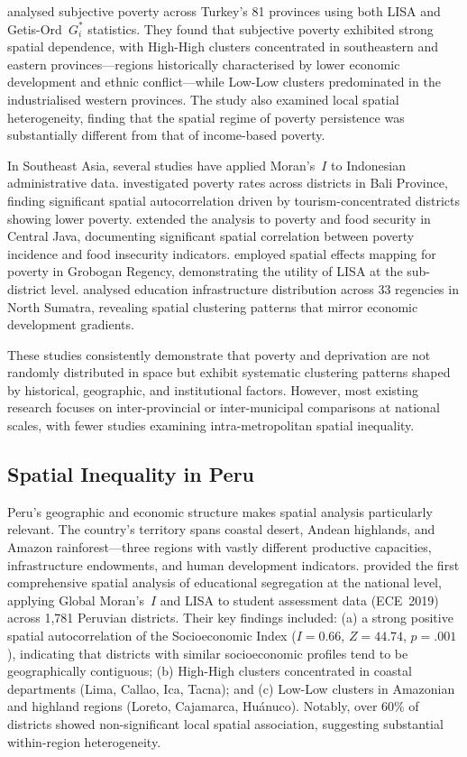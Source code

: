 \documentclass[12pt,a4paper,twoside]{article}
\begin{document}
\citet{tatli2025subjective} analysed subjective poverty across Turkey's 81 provinces
using both LISA and Getis-Ord~$G_i^*$ statistics. They found that subjective poverty
exhibited strong spatial dependence, with High-High clusters concentrated in
southeastern and eastern provinces---regions historically characterised by lower
economic development and ethnic conflict---while Low-Low clusters predominated in
the industrialised western provinces. The study also examined local spatial
heterogeneity, finding that the spatial regime of poverty persistence was
substantially different from that of income-based poverty.

In Southeast Asia, several studies have applied Moran's~$I$ to Indonesian
administrative data. \citet{lestari2023bali} investigated poverty rates across
districts in Bali Province, finding significant spatial autocorrelation driven
by tourism-concentrated districts showing lower poverty. \citet{oktavilia2026mapping}
extended the analysis to poverty and food security in Central Java, documenting
significant spatial correlation between poverty incidence and food insecurity
indicators. \citet{jati2024grobogan} employed spatial effects mapping for poverty
in Grobogan Regency, demonstrating the utility of LISA at the sub-district level.
\citet{harahap2024educacion} analysed education infrastructure distribution across
33 regencies in North Sumatra, revealing spatial clustering patterns that mirror
economic development gradients.

These studies consistently demonstrate that poverty and deprivation are not randomly
distributed in space but exhibit systematic clustering patterns shaped by historical,
geographic, and institutional factors. However, most existing research focuses on
inter-provincial or inter-municipal comparisons at national scales, with fewer
studies examining intra-metropolitan spatial inequality.

\subsection{Spatial Inequality in Peru}

Peru's geographic and economic structure makes spatial analysis particularly
relevant. The country's territory spans coastal desert, Andean highlands, and
Amazon rainforest---three regions with vastly different productive capacities,
infrastructure endowments, and human development indicators. \citet{alonso2025segregacion}
provided the first comprehensive spatial analysis of educational segregation at
the national level, applying Global Moran's~$I$ and LISA to student assessment
data (ECE~2019) across 1,781 Peruvian districts. Their key findings included:
(a) a strong positive spatial autocorrelation of the Socioeconomic Index
($I = 0.66$, $Z = 44.74$, $p = .001$), indicating that districts with similar
socioeconomic profiles tend to be geographically contiguous; (b) High-High
clusters concentrated in coastal departments (Lima, Callao, Ica, Tacna); and
(c) Low-Low clusters in Amazonian and highland regions (Loreto, Cajamarca,
Huánuco). Notably, over 60\% of districts showed non-significant local
spatial association, suggesting substantial within-region heterogeneity.
\end{document}
